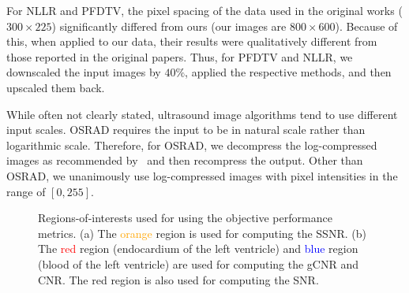 For NLLR and PFDTV, the pixel spacing of the data used in the original works (\(300 \times 225\)) significantly differed from ours (our images are \(800 \times 600\)).
Because of this, when applied to our data, their results were qualitatively different from those reported in the original papers.
Thus, for PFDTV and NLLR, we downscaled the input images by \(40\%\), applied the respective methods, and then upscaled them back.

While often not clearly stated, ultrasound image algorithms tend to use different input scales.
OSRAD requires the input to be in natural scale rather than logarithmic scale.
Therefore, for OSRAD, we decompress the log-compressed images as recommended by~\cite{yongjianyu_generalized_2004} and then recompress the output.
Other than OSRAD, we unanimously use log-compressed images with pixel intensities in the range of \([0, 255]\).
%
\begin{figure}[t]
  \vspace{-0.1in}
  \centering
  \caption{Regions-of-interests used for using the objective performance metrics.
    (a) The \textcolor{orange}{orange} region is used for computing the SSNR.
    (b) The \textcolor{red}{red} region (endocardium of the left ventricle) and \textcolor{blue}{blue} region (blood of the left ventricle) are used for computing the gCNR and CNR.
    The red region is also used for computing the SNR.
  }\label{fig:roi}
  \vspace{-0.1in}
\end{figure}
% 

